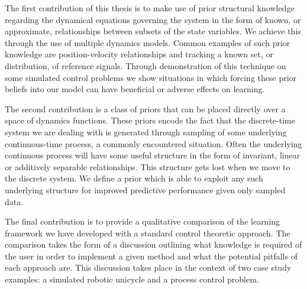\documentclass[a4paper,11pt,twoside,openright]{book}
\begin{document}
The first contribution of this thesis is to make use of prior structural knowledge regarding the dynamical equations governing the system in the form of known, or approximate, relationships between subsets of the state variables. We achieve this through the use of multiple dynamics models. Common examples of such prior knowledge are position-velocity relationships and tracking a known set, or distribution, of reference signals. Through demonstration of this technique on some simulated control problems we show situations in which forcing these prior beliefs into our model can have beneficial or adverse effects on learning.


The second contribution is a class of priors that can be placed directly over a space of dynamics functions. These priors encode the fact that the discrete-time system we are dealing with is generated through sampling of some underlying continuous-time process, a commonly encountered situation. Often the underlying continuous process will have some useful structure in the form of invariant, linear or additively separable relationships. This structure gets lost when we move to the discrete system. We define a prior which is able to exploit any such underlying structure for improved predictive performance given only sampled data.


The final contribution is to provide a qualitative comparison of the learning framework we have developed with a standard control theoretic approach. The comparison takes the form of a discussion outlining what knowledge is required of the user in order to implement a given method and what the potential pitfalls of each approach are. This discussion takes place in the context of two case study examples: a simulated robotic unicycle and a process control problem.




\end{document}
